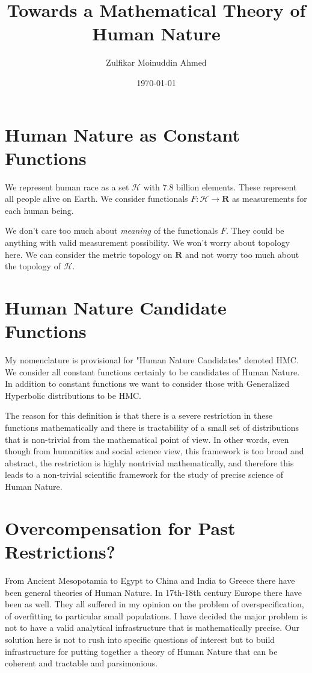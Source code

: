 \documentclass{amsart}
\title{Towards a Mathematical Theory of Human Nature}
\author{Zulfikar Moinuddin Ahmed}
\date{\today}
\begin{document}
\maketitle


\section{Human Nature as Constant Functions}

We represent human race as a set $\mathcal{H}$ with 7.8 billion elements.  These represent all people alive on Earth.
We consider functionals $F:\mathcal{H}\rightarrow \mathbf{R}$ as measurements for each human being.

We don't care too much about {\em meaning} of the functionals $F$.  They could be anything with valid measurement possibility. We won't worry about topology here.  We can consider the metric topology on $\mathbf{R}$ and not worry too much about the topology of $\mathcal{H}$.  

\section{Human Nature Candidate Functions}

My nomenclature is provisional for "Human Nature Candidates" denoted HMC.  We consider all constant functions certainly to be candidates of Human Nature.  In addition to constant functions we want to consider those with Generalized Hyperbolic distributions to be HMC.

The reason for this definition is that there is a severe restriction in these functions mathematically and there is tractability of a small set of distributions that is non-trivial from the mathematical point of view.  In other words, even though from humanities and social science view, this framework is too broad and abstract, the restriction is highly nontrivial mathematically, and therefore this leads to a non-trivial scientific framework for the study of precise science of Human Nature.

\section{Overcompensation for Past Restrictions?}

From Ancient Mesopotamia to Egypt to China and India to Greece there have been general theories of Human Nature.  In 17th-18th century Europe there have been as well.  They all suffered in my opinion on the problem of overspecification, of overfitting to particular small populations.  I have decided the major problem is not to have a valid analytical infrastructure that is mathematically precise.  Our solution here is not to rush into specific questions of interest but to build infrastructure for putting together a theory of Human Nature that can be coherent and tractable and parsimonious.
\end{document}
